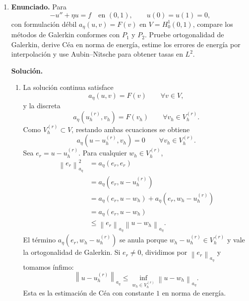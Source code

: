 \documentclass[11pt]{article}
\newcommand{\norm}[1]{\left\lVert #1\right\rVert}
\begin{document}
\begin{enumerate}[label=\textbf{\arabic*.}, leftmargin=*]

    \item \textbf{Enunciado.} Para
    \[
        -u''+\eta u=f\quad\text{en }(0,1),\qquad u(0)=u(1)=0,
    \]
    con formulación débil $a_\eta(u,v)=F(v)$ en $V=H^1_0(0,1)$, compare los métodos de Galerkin conformes con $P_1$ y $P_2$. Pruebe ortogonalidad de Galerkin, derive Céa en norma de energía, estime los errores de energía por interpolación y use Aubin--Nitsche para obtener tasas en $L^2$.

    \textbf{Solución.}
    \begin{enumerate}[label=(\alph*)]
        \item La solución continua satisface
        \[
            a_\eta(u,v)=F(v)\qquad\forall v\in V,
        \]
        y la discreta
        \[
            a_\eta(u_h^{(r)},v_h)=F(v_h)\qquad\forall v_h\in V_h^{(r)}.
        \]
        Como $V_h^{(r)}\subset V$, restando ambas ecuaciones se obtiene
        \[
            a_\eta(u-u_h^{(r)},v_h)=0
            \qquad\forall v_h\in V_h^{(r)}.
        \]
        Sea $e_r=u-u_h^{(r)}$. Para cualquier $w_h\in V_h^{(r)}$,
        \begin{align*}
            \norm{e_r}_{a_\eta}^2
            &=a_\eta(e_r,e_r)\\
            &=a_\eta(e_r,u-u_h^{(r)})\\
            &=a_\eta(e_r,u-w_h)+a_\eta(e_r,w_h-u_h^{(r)})\\
            &=a_\eta(e_r,u-w_h)\\
            &\le \norm{e_r}_{a_\eta}\norm{u-w_h}_{a_\eta}.
        \end{align*}
        El término $a_\eta(e_r,w_h-u_h^{(r)})$ se anula porque $w_h-u_h^{(r)}\in V_h^{(r)}$ y vale la ortogonalidad de Galerkin.
        Si $e_r\neq0$, dividimos por $\norm{e_r}_{a_\eta}$ y tomamos ínfimo:
        \[
            \norm{u-u_h^{(r)}}_{a_\eta}
            \le
            \inf_{w_h\in V_h^{(r)}}\norm{u-w_h}_{a_\eta}.
        \]
        Esta es la estimación de Céa con constante $1$ en norma de energía.


\end{enumerate}
\end{enumerate}
\end{document}
